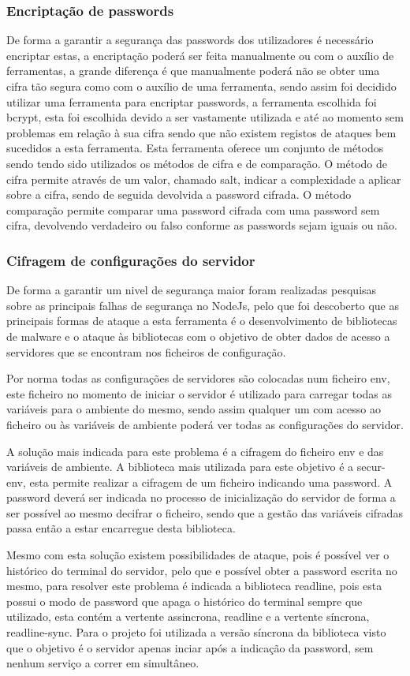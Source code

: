 \subsubsection{Encriptação de passwords}
De forma a garantir a segurança das passwords dos utilizadores é necessário encriptar estas, a encriptação poderá ser feita manualmente ou com o auxílio de ferramentas, a grande diferença é que manualmente poderá não se obter uma cifra tão segura como com o auxílio de uma ferramenta, sendo assim foi decidido utilizar uma ferramenta para encriptar passwords, a ferramenta escolhida foi bcrypt, esta foi escolhida devido a ser vastamente utilizada e até ao momento sem problemas em relação à sua cifra sendo que não existem registos de ataques bem sucedidos a esta ferramenta. Esta ferramenta oferece um conjunto de métodos sendo tendo sido utilizados os métodos de cifra e de comparação. O método de cifra permite através de um valor, chamado salt, indicar a complexidade a aplicar sobre a cifra, sendo de seguida devolvida a password cifrada. O método comparação permite comparar uma password cifrada com uma password sem cifra, devolvendo verdadeiro ou falso conforme as passwords sejam iguais ou não.

\newpage

\subsubsection{Cifragem de configurações do servidor}
De forma a garantir um nivel de segurança maior foram realizadas pesquisas sobre as principais falhas de segurança no NodeJs, pelo que foi descoberto que as principais formas de ataque a esta ferramenta é o desenvolvimento de bibliotecas de malware e o ataque às bibliotecas com o objetivo de obter dados de acesso a servidores que se encontram nos ficheiros de configuração.

Por norma todas as configurações de servidores são colocadas num ficheiro env, este ficheiro no momento de iniciar o servidor é utilizado para carregar todas as variáveis para o ambiente do mesmo, sendo assim qualquer um com acesso ao ficheiro ou às variáveis de ambiente poderá ver todas as configurações do servidor.

A solução mais indicada para este problema é a cifragem do ficheiro env e das variáveis de ambiente. A biblioteca mais utilizada para este objetivo é a secur-env, esta permite realizar a cifragem de um ficheiro indicando uma password. A password deverá ser indicada no processo de inicialização do servidor de forma a ser possível ao mesmo decifrar o ficheiro, sendo que a gestão das variáveis cifradas passa então a estar encarregue desta biblioteca.

Mesmo com esta solução existem possibilidades de ataque, pois é possível ver o histórico do terminal do servidor, pelo que e possível obter a password escrita no mesmo, para resolver este problema é indicada a biblioteca readline, pois esta possui o modo de password que apaga o histórico do terminal sempre que utilizado, esta contém a vertente assincrona, readline e a vertente síncrona, readline-sync. Para o projeto foi utilizada a versão síncrona da biblioteca visto que o objetivo é o servidor apenas inciar após a indicação da password, sem nenhum serviço a correr em simultâneo.